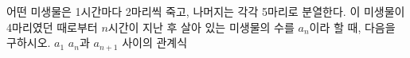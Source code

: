 어떤 미생물은 1시간마다 2마리씩 죽고, 나머지는 각각 5마리로 분열한다. 이 미생물이 4마리였던 때로부터 $n$시간이 지난 후 살아 있는 미생물의 수를 $a_n$이라 할 때, 다음을 구하시오.
 $a_1$
 $a_n$과 $a_{n+1}$ 사이의 관계식
